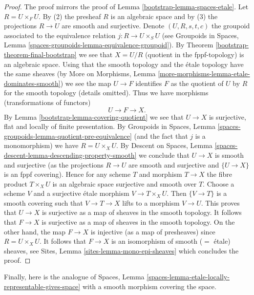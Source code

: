\begin{proof}

The proof mirrors the proof of Lemma \ref{bootstrap-lemma-spaces-etale}. Let
$R = U \times_F U$. By (2) the presheaf $R$ is an algebraic space and by (3)
the projections $R \to U$ are smooth and surjective. Denote $(U, R, s, t, c)$
the groupoid associated to the equivalence relation $j : R \to U \times_S U$
(see Groupoids in Spaces, Lemma
\ref{spaces-groupoids-lemma-equivalence-groupoid}).
By Theorem \ref{bootstrap-theorem-final-bootstrap} we see that $X = U/R$ (quotient
in the fppf-topology) is an algebraic space. Using that the smooth
topology and the \'etale topology have the same sheaves (by
More on Morphisms, Lemma \ref{more-morphisms-lemma-etale-dominates-smooth})
we see the map $U \to F$ identifies $F$ as the quotient of
$U$ by $R$ for the smooth topology (details omitted).
Thus we have morphisms (transformations of functors)
$$
U \to F \to X.
$$
By Lemma \ref{bootstrap-lemma-covering-quotient} we see that $U \to X$ is
surjective, flat and locally of finite presentation. By
Groupoids in Spaces, Lemma
\ref{spaces-groupoids-lemma-quotient-pre-equivalence}
(and the fact that $j$ is a monomorphism) we have $R = U \times_X U$. By
Descent on Spaces, Lemma \ref{spaces-descent-lemma-descending-property-smooth}
we conclude that $U \to X$ is smooth and surjective (as the projections
$R \to U$ are smooth and surjective and $\{U \to X\}$ is an fppf
covering). Hence for any scheme $T$ and morphism $T \to X$ the fibre product
$T \times_X U$ is an algebraic space surjective and smooth over $T$.
Choose a scheme $V$ and a surjective \'etale morphism $V \to T \times_X U$.
Then $\{V \to T\}$ is a smooth covering such that $V \to T \to X$
lifts to a morphism $V \to U$. This proves that
$U \to X$ is surjective as a map of sheaves in the smooth topology.
It follows that $F \to X$ is surjective as a map of sheaves in the smooth
topology. On the other hand, the map $F \to X$ is injective (as a map
of presheaves) since $R = U \times_X U$.
It follows that $F \to X$ is an isomorphism of smooth ($=$ \'etale)
sheaves, see Sites, Lemma \ref{sites-lemma-mono-epi-sheaves}
which concludes the proof.
\end{proof}

Finally, here is the analogue of
Spaces, Lemma \ref{spaces-lemma-etale-locally-representable-gives-space}
with a smooth morphism covering the space.

